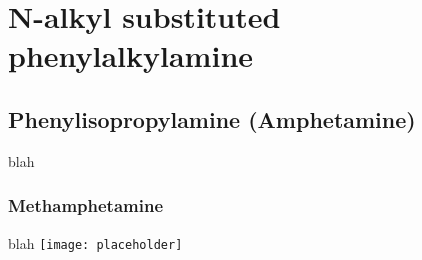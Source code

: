 \section{N-alkyl substituted phenylalkylamine}
\subsection{Phenylisopropylamine (Amphetamine)}
blah
\subsubsection{Methamphetamine}
blah
\texttt{[image: placeholder]}


\clearpage
